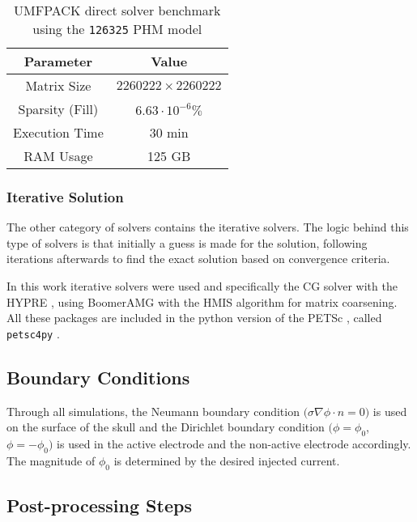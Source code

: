 \begin{table}[!ht]
	\centering
	\caption{\gls{UMFPACK} direct solver benchmark using the \texttt{126325} \gls{PHM} model}
	\label{tab:direct_solver_bench}
	\begin{tabular}{|c|c|}
		\hline
		\rowcolor[HTML]{C0C0C0} 
		\textbf{Parameter} & \textbf{Value} \\ \hline
		Matrix Size & $2260222\times 2260222$ \\ \hline
		Sparsity (Fill) & $6.63\cdot 10^{-6}\%$ \\ \hline
		Execution Time & 30 min \\ \hline
		RAM Usage & 125 GB \\ \hline
	\end{tabular}
\end{table}

\subsubsection{Iterative Solution}

The other category of solvers contains the iterative solvers. The logic behind this type of solvers is that initially a guess is made for the solution, following iterations afterwards to find the exact solution based on convergence criteria.

In this work iterative solvers were used and specifically the \gls{CG} solver with the \gls{HYPRE} \cite{hypre-web-page}, using Boomer\gls{AMG} \cite[chapter 4]{McCormick1987_amg} with the \gls{HMIS} algorithm for matrix coarsening. All these packages are included in the python version of the \gls{PETSc} \cite{petsc-web-page,petsc-user-ref,petsc-efficient}, called \texttt{petsc4py} \cite{Dalcin2011}.

\subsection{Boundary Conditions}
\label{subsec:solver_boundary_conditions}

Through all simulations, the Neumann boundary condition $\big(\sigma\nabla\phi\cdot n = 0\big)$ is used on the surface of the skull and the Dirichlet boundary condition $\big(\phi = \phi_0$, $\phi = -\phi_0\big)$ is used in the active electrode and the non-active electrode accordingly. The magnitude of $\phi_0$ is determined by the desired injected current.

\subsection{Post-processing Steps}
